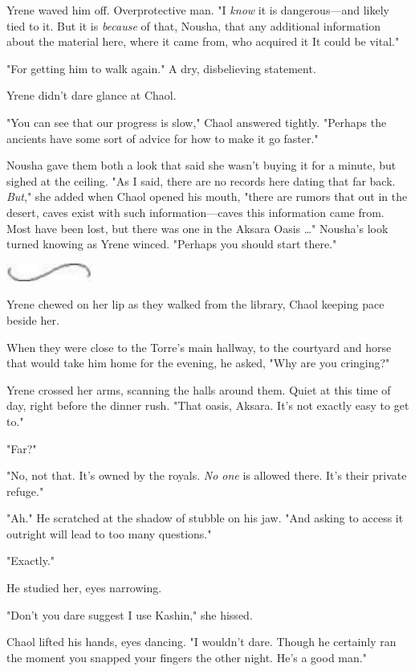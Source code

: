 Yrene waved him off. Overprotective man. "I \emph{know} it is dangerous---and likely tied to it. But it is \emph{because} of that, Nousha, that any additional information about the material here, where it came from, who acquired it  It could be vital."

"For getting him to walk again." A dry, disbelieving statement.

Yrene didn't dare glance at Chaol.

"You can see that our progress is slow," Chaol answered tightly. "Perhaps the ancients have some sort of advice for how to make it go faster."

Nousha gave them both a look that said she wasn't buying it for a minute, but sighed at the ceiling. "As I said, there are no records here dating that far back. \emph{But}," she added when Chaol opened his mouth, "there are rumors that out in the desert, caves exist with such information---caves this information came from. Most have been lost, but there was one in the Aksara Oasis \ldots" Nousha's look turned knowing as Yrene winced. "Perhaps you should start there."

\includegraphics[width=1.12in,height=0.24in]{images/seperator}

Yrene chewed on her lip as they walked from the library, Chaol keeping pace beside her.

When they were close to the Torre's main hallway, to the courtyard and horse that would take him home for the evening, he asked, "Why are you cringing?"

Yrene crossed her arms, scanning the halls around them. Quiet at this time of day, right before the dinner rush. "That oasis, Aksara. It's not exactly  easy to get to."

"Far?"

"No, not that. It's owned by the royals. \emph{No one} is allowed there. It's their private refuge."

"Ah." He scratched at the shadow of stubble on his jaw. "And asking to access it outright will lead to too many questions."

"Exactly."

He studied her, eyes narrowing.

"Don't you dare suggest I use Kashin," she hissed.

Chaol lifted his hands, eyes dancing. "I wouldn't dare. Though he certainly ran the moment you snapped your fingers the other night. He's a good man."

